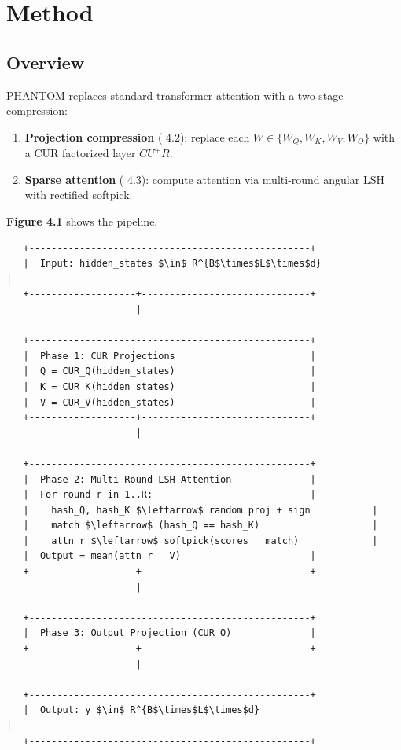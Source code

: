 
\section{Method}

\subsection{Overview}

PHANTOM replaces standard transformer attention with a two-stage compression:

\begin{enumerate}
\item \textbf{Projection compression} ( 4.2): replace each $W \in \{W_Q, W_K, W_V, W_O\}$
  with a CUR factorized layer $C U^+ R$.
\item \textbf{Sparse attention} ( 4.3): compute attention via multi-round angular LSH
  with rectified softpick.

\end{enumerate}
\textbf{Figure 4.1} shows the pipeline.

\begin{lstlisting}
   +--------------------------------------------------+
   |  Input: hidden_states $\in$ R^{B$\times$L$\times$d}                |
   +-------------------+------------------------------+
                       |
                        
   +--------------------------------------------------+
   |  Phase 1: CUR Projections                        |
   |  Q = CUR_Q(hidden_states)                        |
   |  K = CUR_K(hidden_states)                        |
   |  V = CUR_V(hidden_states)                        |
   +-------------------+------------------------------+
                       |
                        
   +--------------------------------------------------+
   |  Phase 2: Multi-Round LSH Attention              |
   |  For round r in 1..R:                            |
   |    hash_Q, hash_K $\leftarrow$ random proj + sign           |
   |    match $\leftarrow$ (hash_Q == hash_K)                    |
   |    attn_r $\leftarrow$ softpick(scores   match)             |
   |  Output = mean(attn_r   V)                       |
   +-------------------+------------------------------+
                       |
                        
   +--------------------------------------------------+
   |  Phase 3: Output Projection (CUR_O)              |
   +-------------------+------------------------------+
                       |
                        
   +--------------------------------------------------+
   |  Output: y $\in$ R^{B$\times$L$\times$d}                           |
   +--------------------------------------------------+
\end{lstlisting}

